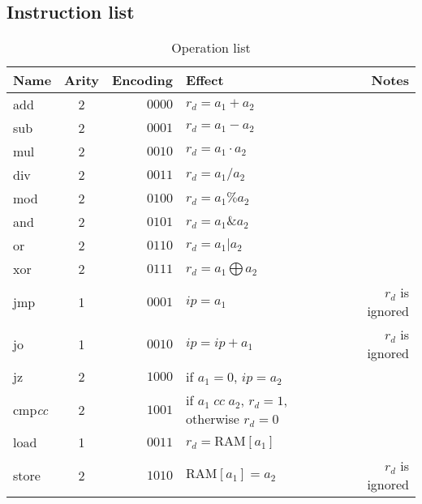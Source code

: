 \documentclass{scrartcl}
\begin{document}
\subsection*{Instruction list}
\begin{table}
  \center
  \caption{Operation list}
  \begin{tabular}{lcrlr}
    \toprule
    \textbf{Name} & \textbf{Arity} & \textbf{Encoding} & \textbf{Effect} & \textbf{Notes}\\
    \midrule
    add & 2 & \(0000\) & \(r_d=a_1+a_2\)\\
    sub & 2 & \(0001\) & \(r_d=a_1-a_2\)\\
    mul & 2 & \(0010\) & \(r_d=a_1\cdot a_2\)\\
    div & 2 & \(0011\) & \(r_d=a_1/a_2\)\\
    mod & 2 & \(0100\) & \(r_d=a_1\% a_2\)\\
    and & 2 & \(0101\) & \(r_d=a_1 \& a_2\)\\
    or & 2 & \(0110\) & \(r_d=a_1 | a_2\)\\
    xor & 2 & \(0111\) & \(r_d=a_1\bigoplus a_2\)\\
    jmp & 1 & \(0001\) & \(ip=a_1\) & \(r_d\) is ignored\\
    jo & 1 & \(0010\) & \(ip=ip+a_1\) & \(r_d\) is ignored\\
    jz & 2 & \(1000\) & if \(a_1=0\), \(ip=a_2\)\\
    cmp\textit{cc} & 2 & \(1001\) & if \(a_1\;cc\;a_2\), \(r_d=1\), otherwise \(r_d=0\)\\
    load & 1 & \(0011\) & \(r_d=\mathrm{RAM}[a_1]\)\\
    store & 2 & \(1010\) & \(\mathrm{RAM}[a_1]=a_2\) & \(r_d\) is ignored\\
    \bottomrule
  \end{tabular}
\end{table}
\end{document}
